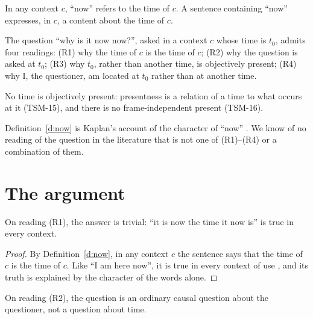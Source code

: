 \documentclass{situationist-preprint}
\begin{document}
\begin{definition}\label{d:now}
In any context $c$, \enquote{now} refers to the time of $c$. A sentence containing \enquote{now} expresses, in $c$, a content about the time of $c$.
\end{definition}

\begin{definition}[Readings]\label{d:read}
The question \enquote{why is it now now?}, asked in a context $c$ whose time is $t_0$, admits four readings: (R1) why the time of $c$ is the time of $c$; (R2) why the question is asked at $t_0$; (R3) why $t_0$, rather than another time, is objectively present; (R4) why I, the questioner, am located at $t_0$ rather than at another time.
\end{definition}

\begin{principle}\label{p:nopriv}
No time is objectively present: presentness is a relation of a time to what occurs at it (TSM-15), and there is no frame-independent present (TSM-16).
\end{principle}

Definition~\ref{d:now} is Kaplan's account of the character of \enquote{now} \citep{Kaplan1989}. We know of no reading of the question in the literature that is not one of (R1)--(R4) or a combination of them.

\section{The argument}

\begin{proposition}\label{p:r1}
On reading (R1), the answer is trivial: \enquote{it is now the time it now is} is true in every context.
\end{proposition}

\begin{proof}
By Definition~\ref{d:now}, in any context $c$ the sentence says that the time of $c$ is the time of $c$. Like \enquote{I am here now}, it is true in every context of use \citep{Kaplan1989}, and its truth is explained by the character of the words alone.
\end{proof}

\begin{proposition}\label{p:r2}
On reading (R2), the question is an ordinary causal question about the questioner, not a question about time.
\end{proposition}
\end{document}

